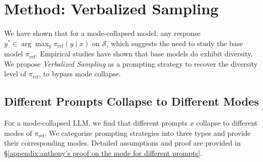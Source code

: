\newcommand{\one}{\mathbf{1}}
\newcommand{\supp}{\operatorname{supp}}
\newcommand{\simplex}{\Delta}

\section{Method: Verbalized Sampling}\label{sec:vs}
 We have shown that for a mode-collapsed model, any response $y^* \in \arg\max_y \pi_\text{ref}(y \mid x)$ on $\mathcal{S}$, which suggests the need to study the base model $\pi_\text{ref}  $. %
 Empirical studies \citep{west_base_2025, zhu2025bareleveragingbaselanguage} have shown that base models do exhibit diversity. We propose \emph{Verbalized Sampling} as a prompting strategy to recover the diversity level of $\pi_{\textrm{ref}}$, to bypass mode collapse. 



\subsection{Different Prompts Collapse to Different Modes}\label{subsec:constrained}

For a mode-collapsed LLM, we find that different prompts $x$ collapse to different modes of $\pi_\text{ref}$. We categorize prompting strategies into three types and provide their corresponding modes. Detailed assumptions and proof are provided in \S\ref{appendix:anthony's proof on the mode for different prompts}. %




